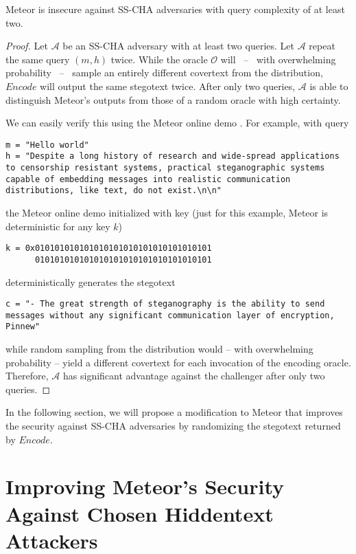 \begin{theorem}
  Meteor is insecure against SS-CHA adversaries with query complexity of at least two.	
\end{theorem}
\begin{proof}
Let $\mathcal{A}$ be an SS-CHA adversary with at least two queries.
Let $\mathcal{A}$ repeat the same query $(m,h)$ twice.
While the oracle $\mathcal{O}$ will~ --~ with overwhelming probability~ --~ sample an entirely different covertext from the distribution,  $Encode$ will output the same stegotext twice.
After only two queries, $\mathcal{A}$ is able to distinguish Meteor's outputs from those of a random oracle with high certainty.

We can easily verify this using the Meteor online demo \cite{MeteorDemo2021}.
For example, with query
\begin{lstlisting}
m = "Hello world"
h = "Despite a long history of research and wide-spread applications to censorship resistant systems, practical steganographic systems capable of embedding messages into realistic communication distributions, like text, do not exist.\n\n"
\end{lstlisting}
the Meteor online demo initialized with key (just for this example, Meteor is deterministic for any key $k$)
\begin{lstlisting}
k = 0x010101010101010101010101010101010101
      010101010101010101010101010101010101
\end{lstlisting}
deterministically generates the stegotext
\begin{lstlisting}
c = "- The great strength of steganography is the ability to send messages without any significant communication layer of encryption, Pinnew"
\end{lstlisting}
while random sampling from the distribution would -- with overwhelming probability -- yield a different covertext for each invocation of the encoding oracle.
Therefore, $\mathcal{A}$ has significant advantage against the challenger after only two queries.
\end{proof}

In the following section, we will propose a modification to Meteor that improves the security against SS-CHA adversaries by randomizing the stegotext returned by $Encode$.

\section{Improving Meteor's Security Against Chosen Hiddentext Attackers}

